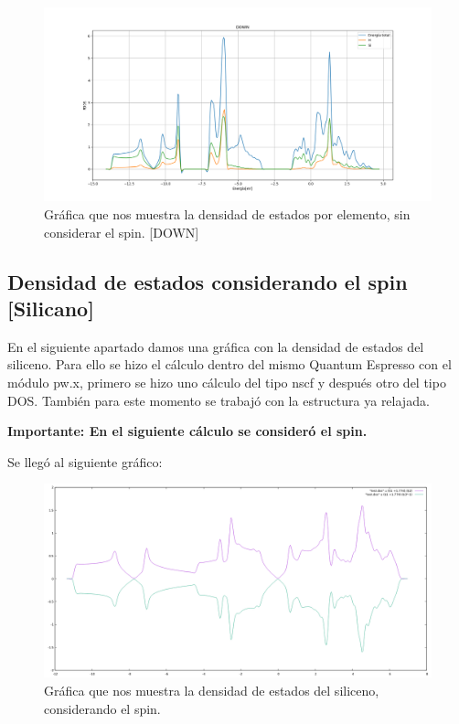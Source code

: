 \begin{figure}[H]
    \centering
    \includegraphics[scale=0.38]{images_silicano/Densidad_estados_sin_spin_down_elementos.png}
    \caption{Gráfica que nos muestra la densidad de estados por elemento, sin considerar el spin. [DOWN]}
\end{figure}


\newpage

\subsection{Densidad de estados considerando el spin [Silicano]}

En el siguiente apartado damos una gráfica con la densidad de estados del siliceno. Para 
ello se hizo el cálculo dentro del mismo Quantum Espresso con el módulo pw.x, primero se hizo uno cálculo 
del tipo nscf y después otro del tipo DOS. También para este momento se trabajó con la estructura
ya relajada.

\vspace{0.5cm}

\textbf{Importante: En el siguiente cálculo se consideró el spin.}

\vspace{0.5cm}

Se llegó al siguiente gráfico:

\begin{figure}[H]
    \centering
    \includegraphics[scale=0.33]{images_siliceno/densidad_estados_con_spin.png}
    \caption{Gráfica que nos muestra la densidad de estados del siliceno, considerando el spin.}
\end{figure}

